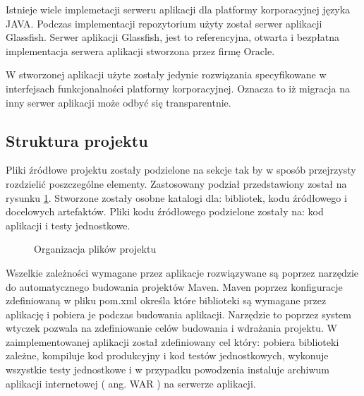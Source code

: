 Istnieje wiele implemetacji serweru aplikacji dla platformy korporacyjnej języka JAVA. Podczas implementacji repozytorium użyty został serwer aplikacji Glassfish. Serwer aplikacji Glassfish, jest to referencyjna, otwarta i bezpłatna implementacja serwera aplikacji stworzona przez firmę Oracle. 

W stworzonej aplikacji użyte zostały jedynie rozwiązania specyfikowane w interfejsach funkcjonalności platformy korporacyjnej. Oznacza to iż migracja na inny serwer aplikacji może odbyć się transparentnie.
\subsection{Struktura projektu}
Pliki źródłowe projektu zostały podzielone na sekcje tak by w sposób przejrzysty rozdzielić poszczególne elementy. Zastosowany podział przedstawiony został na rysunku \ref{fig:stukturaProjektu}. Stworzone zostały osobne katalogi dla: bibliotek, kodu źródłowego i docelowych artefaktów. Pliki kodu źródłowego podzielone zostały na: kod aplikacji i testy jednostkowe.

\begin{figure}[h!]

\caption{Organizacja plików projektu}
\label{fig:stukturaProjektu}
\end{figure}

Wszelkie zależności wymagane przez aplikacje rozwiązywane są poprzez narzędzie do automatycznego budowania projektów Maven. Maven poprzez konfiguracje zdefiniowaną w pliku pom.xml określa które biblioteki są wymagane przez aplikację i pobiera je podczas budowania aplikacji. Narzędzie to poprzez system wtyczek pozwala na zdefiniowanie celów budowania i wdrażania projektu. W zaimplementowanej aplikacji został zdefiniowany cel który: pobiera biblioteki zależne, kompiluje kod produkcyjny i kod testów jednostkowych, wykonuje wszystkie testy jednostkowe i w przypadku powodzenia instaluje archiwum aplikacji internetowej ( ang. WAR ) na serwerze aplikacji.


